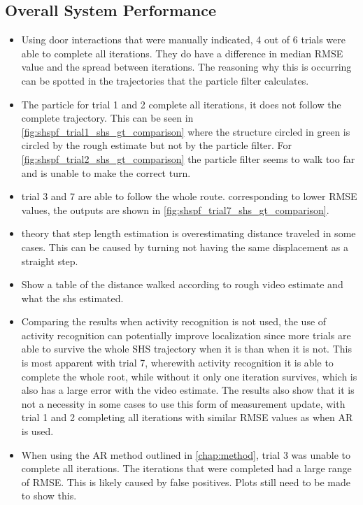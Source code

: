 \newpage
\subsection*{Overall System Performance}

\begin{itemize}
	\item Using door interactions that were manually indicated, 4 out of 6 trials were able to complete all iterations. They do have a difference in median RMSE value and the spread between iterations. The reasoning why this is occurring can be spotted in the trajectories that the particle filter calculates.  
	\item The particle for trial 1 and 2 complete all iterations, it does not follow the complete trajectory. This can be seen in  \cref{fig:shspf_trial1_shs_gt_comparison} where the structure circled in green is circled by the rough estimate but not by the particle filter. For \cref{fig:shspf_trial2_shs_gt_comparison} the particle filter seems to walk too far and is unable to make the correct turn.
	\item trial 3 and 7 are able to follow the whole route. corresponding to lower RMSE values, the outputs are shown in \cref{fig:shspf_trial7_shs_gt_comparison}.
	\item theory that step length estimation is overestimating distance traveled in some cases. This can be caused by turning not having the same displacement as a straight step.
	\item Show a table of the distance walked according to rough video estimate and what the shs estimated.
	\item Comparing the results when activity recognition is not used, the use of activity recognition can potentially improve localization since more trials are able to survive the whole SHS trajectory when it is than when it is not. This is most apparent with trial 7, wherewith activity recognition it is able to complete the whole root, while without it only one iteration survives, which is also has a large error with the video estimate. The results also show that it is not a necessity in some cases to use this form of measurement update, with trial 1 and 2 completing all iterations with similar RMSE values as when AR is used.
	\item When using the AR method outlined in \cref{chap:method}, trial 3 was unable to complete all iterations. The iterations that were completed had a large range of RMSE. This is likely caused by false positives. Plots still need to be made to show this.
\end{itemize}


